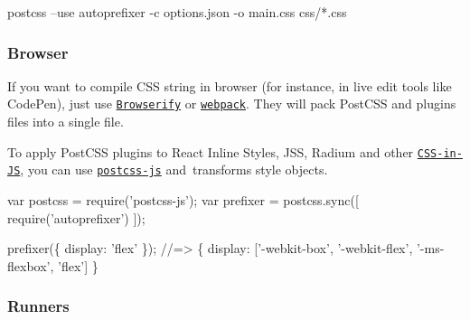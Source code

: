 \begin{DoxyCode}
postcss --use autoprefixer -c options.json -o main.css css/*.css
\end{DoxyCode}


\subsubsection*{Browser}

If you want to compile C\+SS string in browser (for instance, in live edit tools like Code\+Pen), just use \href{http://browserify.org/}{\tt Browserify} or \href{https://webpack.github.io/}{\tt webpack}. They will pack Post\+C\+SS and plugins files into a single file.

To apply Post\+C\+SS plugins to React Inline Styles, J\+SS, Radium and other \href{https://github.com/MicheleBertoli/css-in-js}{\tt C\+S\+S-\/in-\/\+JS}, you can use \href{https://github.com/postcss/postcss-js}{\tt {\ttfamily postcss-\/js}} and transforms style objects.


\begin{DoxyCode}
var postcss  = require('postcss-js');
var prefixer = postcss.sync([ require('autoprefixer') ]);

prefixer(\{ display: 'flex' \}); //=> \{ display: ['-webkit-box', '-webkit-flex', '-ms-flexbox', 'flex'] \}
\end{DoxyCode}


\subsubsection*{Runners}



